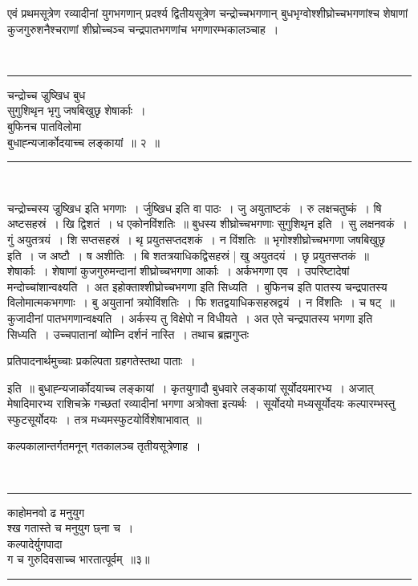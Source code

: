 \documentclass[12pt,a4paper]{report}
\newenvironment{moola}
{
~\\
\hrule
\begin{center}
\begin{LARGE}
}
{
\end{LARGE}
\end{center}
\hrule
~\\
}
\begin{document}
एवं प्रथमसूत्रेण रव्यादीनां युगभगणान् प्रदर्श्य द्वितीयसूत्रेण चन्द्रोच्चभगणान् बुधभृग्वोश्शीघ्रोच्चभगणांश्च शेषाणां कुजगुरुशनैश्चराणां शीघ्रोच्चञ्च चन्द्रपातभगणांच भगणारम्भकालञ्चाह~।

\begin{moola}
चन्द्रोच्च ज्रुष्खिध बुध \\
सुगुशिथृन भृगु जषबिखुछृ शेषार्काः~। \\
बुफिनच पातविलोमा \\
बुधाह्न्यजार्कोदयाच्च लङ्कायां~॥ २~॥
\end{moola}

चन्द्रोच्चस्य ज्रुष्खिध इति भगणाः~। र्जुष्खिध इति वा पाठः~। जु अयुताष्टकं~। रु लक्षचतुष्कं~। षि अष्टसहस्रं~। खि द्विशतं~। ध एकोनविंशतिः~॥  बुधस्य
शीघ्रोच्चभगणाः सुगुशिथृन इति~। सु लक्षनवकं~। गुं अयुतत्रयं~। शि सप्तसहस्रं~। थृ प्रयुतसप्तदशकं~। न विंशतिः~॥ भृगोश्शीघ्रोच्चभगणा जषबिखुछृ इति~। ज अष्टौ~। ष अशीतिः~। बि शतत्रयाधिकद्विसहस्रं | खु अयुतदयं~। छृ प्रयुतसप्तकं~॥ शेषार्काः~। शेषाणां कुजगुरुमन्दानां शीघ्रोच्चभगणा आर्काः~। अर्कभगणा एव~। उपरिष्टादेषां मन्दोच्चांशान्वक्ष्यति~। अत इहोक्ताश्शीघ्रोच्चभगणा इति सिध्यति~। बुफिनच इति पातस्य चन्द्रपातस्य विलोमात्मकभगणाः~। बु अयुतानां त्रयोविंशतिः~। फि शतद्वयाधिकसहस्रद्वयं~। न विंशतिः~। च षट्~॥ कुजादीनां पातभगणान्वक्ष्यति~। अर्कस्य तु विक्षेपो न विधीयते~। अत एते चन्द्रपातस्य भगणा इति सिध्यति~। उच्चपातानां व्योम्नि दर्शनं नास्ति~। तथाच ब्रह्मगुप्तः

\begin{center}
 \begin{large}
प्रतिपादनार्थमुच्चाः प्रकल्पिता ग्रहगतेस्तथा पाताः~।
\end{large}
\end{center}

इति~॥ बुधाह्न्यजार्कोदयाच्च लङ्कायां~। कृतयुगादौ बुधवारे लङ्कायां सूर्योदयमारभ्य~। अजात् मेषादिमारभ्य राशिचक्रे गच्छतां रव्यादीनां भगणा अत्रोक्ता इत्यर्थः~। सूर्योदयो मध्यसूर्योदयः कल्पारम्भस्तु स्फुटसूर्योदयः~। तत्र मध्यमस्फुटयोर्विशेषाभावात्~॥ 

कल्पकालान्तर्गतमनून् गतकालञ्च तृतीयसूत्रेणाह~।

 \begin{moola}
काहोमनवो ढ मनुयुग \\
श्ख गतास्ते च मनुयुग छ्ना च~। \\
कल्पादेर्युगपादा \\
ग च गुरुदिवसाच्च भारतात्पूर्वम्~॥३॥
\end{moola}
\end{document}
